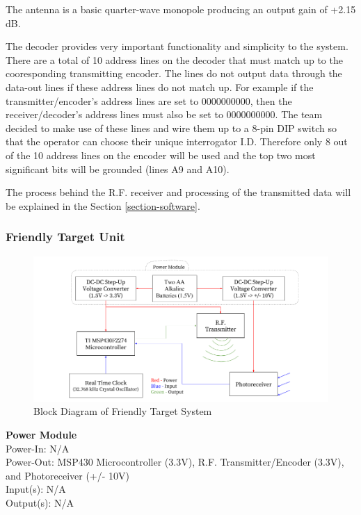 \documentclass[letterpaper,10pt]{article}
\begin{document}
\begin{spacing}{1.15}
The antenna is a basic quarter-wave monopole producing an output gain of +2.15 dB.

The decoder provides very important functionality and simplicity to the system. There are a total of 10 address lines on the decoder that must match up to the cooresponding transmitting encoder. The lines do not output data through the data-out lines if these address lines do not match up. For example if the transmitter/encoder's address lines are set to 0000000000, then the receiver/decoder's address lines must also be set to 0000000000. The team decided to make use of these lines and wire them up to a 8-pin DIP switch so that the operator can choose their unique interrogator I.D. Therefore only 8 out of the 10 address lines on the encoder will be used and the top two most significant bits will be grounded (lines A9 and A10).

The process behind the R.F. receiver and processing of the transmitted data will be explained in the Section \ref{section-software}.

\subsubsection{Friendly Target Unit}

\begin{figure} [H]
	\centering
	\includegraphics[scale=0.50]{Friendly_Target_Block_Diagram.png}
	\caption{Block Diagram of Friendly Target System\label{fig:friendly-target-block}}
\end{figure}

\normalsize\textbf{Power Module} \\
Power-In: N/A\\
Power-Out: MSP430 Microcontroller (3.3V), R.F. Transmitter/Encoder (3.3V), and Photoreceiver (+/- 10V)\\
Input(s): N/A\\
Output(s): N/A


\end{spacing}
\end{document}
